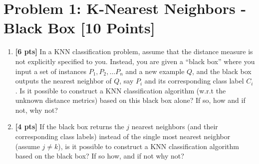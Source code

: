 \section*{Problem 1: K-Nearest Neighbors - Black Box [10 Points]}

\begin{enumerate}

        \item \textbf{[6 pts]} In a KNN classification problem, assume that the distance measure is not explicitly specified to you. Instead, you are given a “black box” where you input a set of instances $P_1, P_2, \dots P_n$ and a new example $Q$, and the black box outputs the nearest neighbor of $Q$, say $P_i$ and its corresponding class label $C_i$. Is it possible to construct a KNN classification algorithm (w.r.t the unknown distance metrics) based on this black box alone? If so, how and if not, why not?
        \begin{tcolorbox}[fit,height=7cm, width=0.9\textwidth, blank, borderline={1pt}{-2pt}]
        \end{tcolorbox}
        
        \item \textbf{[4 pts]} If the black box returns the $j$ nearest neighbors (and their corresponding class labels) instead of the single most nearest neighbor (assume $j \neq k$), is it possible to construct a KNN classification algorithm based on the black box? If so how, and if not why not?
        \begin{tcolorbox}[fit,height=7cm, width=0.9\textwidth, blank, borderline={1pt}{-2pt}]
        \end{tcolorbox}
    

    \clearpage
\end{enumerate}